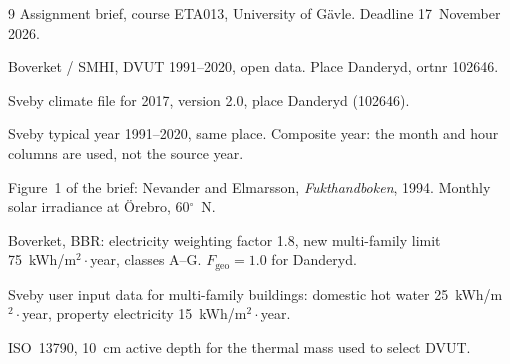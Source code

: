 \documentclass[11pt,a4paper]{article}
\begin{document}
\begin{thebibliography}{9}
  Assignment brief, course ETA013, University of G\"avle.
  Deadline 17~November 2026.

  Boverket / SMHI, DVUT 1991--2020, open data.
  Place Danderyd, ortnr 102646.

  Sveby climate file for 2017, version 2.0, place Danderyd (102646).

  Sveby typical year 1991--2020, same place.
  Composite year: the month and hour columns are used, not the source year.

  Figure~1 of the brief: Nevander and Elmarsson,
  \emph{Fukthandboken}, 1994. Monthly solar irradiance at \"Orebro, 60$^{\circ}$~N.

  Boverket, BBR: electricity weighting factor 1.8,
  new multi-family limit 75~kWh/m$^{2}{\cdot}$year, classes A--G.
  $F_{\mathrm{geo}} = 1.0$ for Danderyd.

  Sveby user input data for multi-family buildings:
  domestic hot water 25~kWh/m$^{2}{\cdot}$year,
  property electricity 15~kWh/m$^{2}{\cdot}$year.

  ISO~13790, 10~cm active depth for the thermal mass used to select DVUT.
\end{thebibliography}
\end{document}
